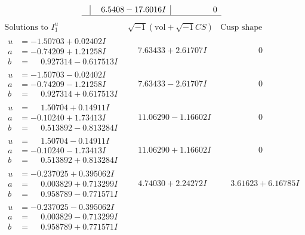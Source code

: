 \documentclass[1p]{elsarticle_modified}
\theoremstyle{definition}
\newcommand{\I}{\sqrt{-1}}
\begin{document}
$$\begin{array}{c|c|c}
 & \phantom{-}6.5408 - 17.6016 I & \phantom{-0.000000 } 0\\
 \hline 
 \end{array}$$\newpage$$\begin{array}{c|c|c}  
\text{Solutions to }I^u_{1}& \I (\text{vol} + \sqrt{-1}CS) & \text{Cusp shape}\\
 \hline 
\begin{aligned}
u &= -1.50703 + 0.02402 I \\
a &= -0.74209 + 1.21258 I \\
b &= \phantom{-}0.927314 - 0.617513 I\end{aligned}
 & \phantom{-}7.63433 + 2.61707 I & \phantom{-0.000000 } 0 \\ \hline\begin{aligned}
u &= -1.50703 - 0.02402 I \\
a &= -0.74209 - 1.21258 I \\
b &= \phantom{-}0.927314 + 0.617513 I\end{aligned}
 & \phantom{-}7.63433 - 2.61707 I & \phantom{-0.000000 } 0 \\ \hline\begin{aligned}
u &= \phantom{-}1.50704 + 0.14911 I \\
a &= -0.10240 + 1.73413 I \\
b &= \phantom{-}0.513892 - 0.813284 I\end{aligned}
 & \phantom{-}11.06290 - 1.16602 I & \phantom{-0.000000 } 0 \\ \hline\begin{aligned}
u &= \phantom{-}1.50704 - 0.14911 I \\
a &= -0.10240 - 1.73413 I \\
b &= \phantom{-}0.513892 + 0.813284 I\end{aligned}
 & \phantom{-}11.06290 + 1.16602 I & \phantom{-0.000000 } 0 \\ \hline\begin{aligned}
u &= -0.237025 + 0.395062 I \\
a &= \phantom{-}0.003829 + 0.713299 I \\
b &= \phantom{-}0.958789 - 0.771571 I\end{aligned}
 & \phantom{-}4.74030 + 2.24272 I & \phantom{-}3.61623 + 6.16785 I \\ \hline\begin{aligned}
u &= -0.237025 - 0.395062 I \\
a &= \phantom{-}0.003829 - 0.713299 I \\
b &= \phantom{-}0.958789 + 0.771571 I\end{aligned}

\end{array}$$
\end{document}
